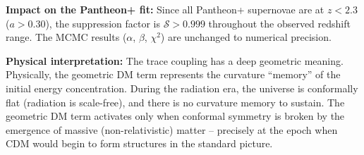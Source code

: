 \documentclass[aps,prd,twocolumn,superscriptaddress,nofootinbib,floatfix]{revtex4-2}
\begin{document}
\textbf{Impact on the Pantheon+ fit:} Since all Pantheon+ supernovae are at $z < 2.3$ ($a > 0.30$), the suppression factor is $\mathcal{S} > 0.999$ throughout the observed redshift range. The MCMC results ($\alpha$, $\beta$, $\chi^2$) are unchanged to numerical precision.

\textbf{Physical interpretation:} The trace coupling has a deep geometric meaning. Physically, the geometric DM term represents the curvature ``memory'' of the initial energy concentration. During the radiation era, the universe is conformally flat (radiation is scale-free), and there is no curvature memory to sustain. The geometric DM term activates only when conformal symmetry is broken by the emergence of massive (non-relativistic) matter -- precisely at the epoch when CDM would begin to form structures in the standard picture.
\end{document}
